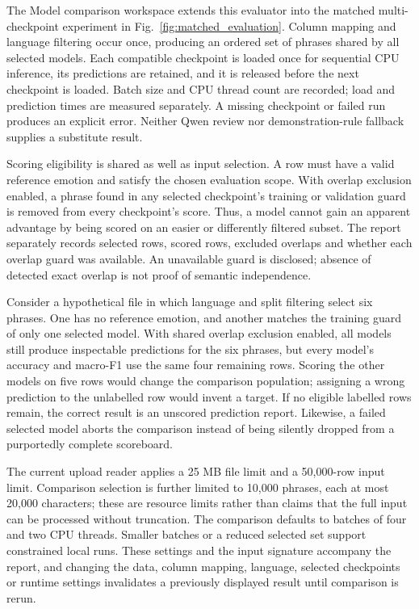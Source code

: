 \documentclass[journal]{IEEEtran}
\begin{document}
The Model comparison workspace extends this evaluator into the matched multi-checkpoint experiment in Fig.~\ref{fig:matched_evaluation}. Column mapping and language filtering occur once, producing an ordered set of phrases shared by all selected models. Each compatible checkpoint is loaded once for sequential CPU inference, its predictions are retained, and it is released before the next checkpoint is loaded. Batch size and CPU thread count are recorded; load and prediction times are measured separately. A missing checkpoint or failed run produces an explicit error. Neither Qwen review nor demonstration-rule fallback supplies a substitute result.

Scoring eligibility is shared as well as input selection. A row must have a valid reference emotion and satisfy the chosen evaluation scope. With overlap exclusion enabled, a phrase found in any selected checkpoint's training or validation guard is removed from every checkpoint's score. Thus, a model cannot gain an apparent advantage by being scored on an easier or differently filtered subset. The report separately records selected rows, scored rows, excluded overlaps and whether each overlap guard was available. An unavailable guard is disclosed; absence of detected exact overlap is not proof of semantic independence.

Consider a hypothetical file in which language and split filtering select six phrases. One has no reference emotion, and another matches the training guard of only one selected model. With shared overlap exclusion enabled, all models still produce inspectable predictions for the six phrases, but every model's accuracy and macro-F1 use the same four remaining rows. Scoring the other models on five rows would change the comparison population; assigning a wrong prediction to the unlabelled row would invent a target. If no eligible labelled rows remain, the correct result is an unscored prediction report. Likewise, a failed selected model aborts the comparison instead of being silently dropped from a purportedly complete scoreboard.

The current upload reader applies a 25 MB file limit and a 50,000-row input limit. Comparison selection is further limited to 10,000 phrases, each at most 20,000 characters; these are resource limits rather than claims that the full input can be processed without truncation. The comparison defaults to batches of four and two CPU threads. Smaller batches or a reduced selected set support constrained local runs. These settings and the input signature accompany the report, and changing the data, column mapping, language, selected checkpoints or runtime settings invalidates a previously displayed result until comparison is rerun.
\end{document}

